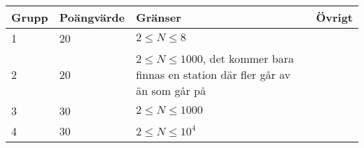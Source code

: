 \begin{tabular}{| l | l | l | l |}
\hline
Grupp & Poängvärde & Gränser & Övrigt\\ \hline
1     & 20         & $ 2 \le N \le 8 $ & \\ \hline
2     & 20         & $ 2 \le N \le 1000 $, det kommer bara finnas en station där fler går av än som går på & \\ \hline
3     & 30         & $ 2 \le N \le 1000 $ & \\ \hline
4     & 30         & $ 2 \le N \le 10^4 $ & \\ \hline
\end{tabular}
